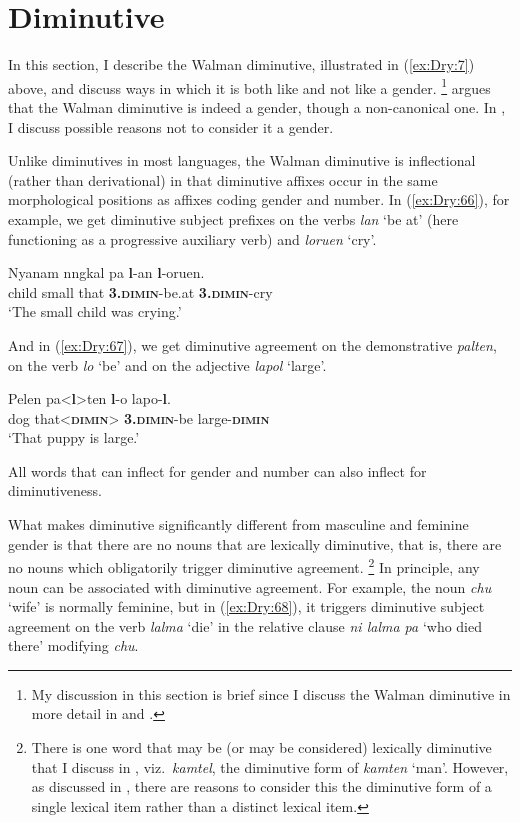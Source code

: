 \documentclass[output=collectionpaper]{langsci/langscibook}
\begin{document}
\section{Diminutive}
\label{sec:Dry:5}

In this section, I describe the Walman diminutive, illustrated in (\ref{ex:Dry:7}) above, and discuss ways in which it is both like and not like a gender.%
\footnote{My discussion in this section is brief since I discuss the Walman diminutive in more detail in \citet{DryerUnderrevision} and \citet{Dryer2016}.} %
\citet[149]{Corbett2012} argues that the Walman diminutive is indeed a gender, though a non-canonical one. In \citet{Dryer2016}, I discuss possible reasons not to consider it a gender.

Unlike diminutives in most languages, the Walman diminutive is inflectional (rather than derivational) in that diminutive affixes occur in the same morphological positions as affixes coding gender and number. In (\ref{ex:Dry:66}), for example, we get diminutive subject prefixes on the verbs \textit{lan} `be at' (here functioning as a progressive auxiliary verb) and \textit{loruen} `cry'.

\ea \label{ex:Dry:66}
\gll Nyanam	nngkal	pa	\textbf{l}-an	\textbf{l}-oruen.\\
child small that \textbf{\textsc{3.dimin}}-be.at \textbf{\textsc{3.dimin}}-cry\\
\glt `The small child was crying.'
\z

And in (\ref{ex:Dry:67}), we get diminutive agreement on the demonstrative \textit{palten}, on the verb \textit{lo} `be' and on the adjective \textit{lapol} `large'.

\ea \label{ex:Dry:67}
\gll Pelen	pa<\textbf{l}>ten	\textbf{l}-o	lapo-\textbf{l}.\\
dog that<\textbf{\textsc{dimin}}> \textbf{\textsc{3.dimin}}-be large-\textbf{\textsc{dimin}}\\
\glt `That puppy is large.'
\z

All words that can inflect for gender and number can also inflect for diminutiveness.

What makes diminutive significantly different from masculine and feminine gender is that there are no nouns that are lexically diminutive, that is, there are no nouns which obligatorily trigger diminutive agreement.%
\footnote{There is one word that may be (or may be considered) lexically diminutive that I discuss in \citet{DryerUnderrevision}, viz.\ \textit{kamtel}, the diminutive form of \textit{kamten} `man'. However, as discussed in \citep{DryerUnderrevision}, there are reasons to consider this the diminutive form of a single lexical item rather than a distinct lexical item.} %
In principle, any noun can be associated with diminutive agreement. For example, the noun \textit{chu} `wife' is normally feminine, but in (\ref{ex:Dry:68}), it triggers diminutive subject agreement on the verb \textit{lalma} `die' in the relative clause \textit{ni lalma pa} `who died there' modifying \textit{chu}.
\end{document}

